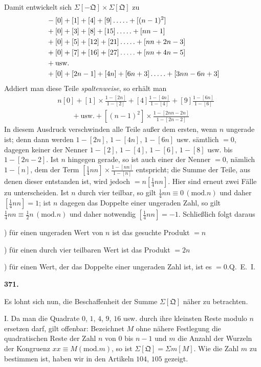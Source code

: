 Damit entwickelt sich $\Sigma[-\mathfrak{Q}]\times\Sigma[\mathfrak{Q}]$ zu
\[
\begin{aligned}
&-[0]+[1]+[4]+[9]\mathinner{.\,.\,.\,.\,.}+[(n-1)^2]\\
&+[0]+[3]+[8]+[15]\mathinner{.\,.\,.\,.\,.}+[nn-1]\\
&+[0]+[5]+[12]+[21]\mathinner{.\,.\,.\,.\,.}+[nn+2n-3]\\
&+[0]+[7]+[16]+[27]\mathinner{.\,.\,.\,.\,.}+[nn+4n-5]\\
&+\text{usw.}\\
&+[0]+[2n-1]+[4n]+[6n+3]\mathinner{.\,.\,.\,.\,.}+[3nn-6n+3]
\end{aligned}
\]
Addiert man diese Teile \textit{spaltenweise}, so erhält man
\[
\begin{aligned}
&n[0]+[1]\times\frac{1-[2n]}{1-[2]}+[4]\frac{1-[4n]}{1-[4]}+[9]\frac{1-[6n]}{1-[6]}\\
&\qquad+\text{usw.}+[(n-1)^2]\times\frac{1-[2nn-2n]}{1-[2n-2]}
\end{aligned}
\]
In diesem Ausdruck verschwinden alle Teile außer dem ersten, wenn $n$ ungerade ist; denn dann werden $1-[2n]$, $1-[4n]$, $1-[6n]$ usw. sämtlich $=0$, dagegen keiner der Nenner $1-[2]$, $1-[4]$, $1-[6]$, $1-[8]$ usw. bis $1-[2n-2]$. Ist $n$ hingegen gerade, so ist auch einer der Nenner $=0$, nämlich $1-[n]$, dem der Term $[\frac14nn]\times\frac{1-[nn]}{1-[n]}$ entspricht; die Summe der Teile, aus denen dieser entstanden ist, wird jedoch $=n[\frac14nn]$. Hier sind erneut zwei Fälle zu unterscheiden. Ist $n$ durch vier teilbar, so gilt $\frac14nn\equiv0\, (\mathrm{mod}.n)$ und daher $[\frac14nn]=1$; ist $n$ dagegen das Doppelte einer ungeraden Zahl, so gilt $\frac14nn\equiv\frac12n\, (\mathrm{mod}.n)$ und daher notwendig $[\frac14nn]=-1$. Schließlich folgt daraus
\par{}) für einen ungeraden Wert von $n$ ist das gesuchte Produkt $=n$
\par{}) für einen durch vier teilbaren Wert ist das Produkt $=2n$
\par{}) für einen Wert, der das Doppelte einer ungeraden Zahl ist, ist es $=0$.\quad \mbox{Q. E. I.}
\par\medskip{}\centerline{\textbf{371.}}\nobreak\smallskip
Es lohnt sich nun, die Beschaffenheit der Summe $\Sigma[\mathfrak{Q}]$ näher zu betrachten.
\par I. Da man die Quadrate $0$, $1$, $4$, $9$, $16$ usw. durch ihre kleinsten Reste modulo $n$ ersetzen darf, gilt offenbar: Bezeichnet $M$ ohne nähere Festlegung die quadratischen Reste der Zahl $n$ von $0$ bis $n-1$ und $m$ die Anzahl der Wurzeln der Kongruenz $xx\equiv M(\mathrm{mod}.m)$, so ist $\Sigma[\mathfrak{Q}]=\Sigma m[M]$. Wie die Zahl $m$ zu bestimmen ist, haben wir in den Artikeln $104$, $105$ gezeigt.
